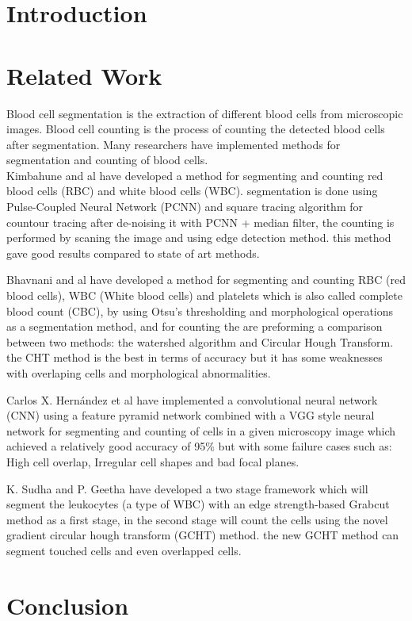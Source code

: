 \section{Introduction}
\vspace{0.2in}
\hspace*{0.16in}

\section{Related Work}
\vspace{0.2in}
\hspace*{0.16in}
Blood cell segmentation is the extraction of different blood cells from microscopic images. Blood cell counting is the process of counting the detected blood cells after segmentation. Many researchers have implemented methods for segmentation and counting of blood cells.\\

Kimbahune and al \textsuperscript{\cite{kimbahune2011blood}} have developed a method for segmenting and counting red blood cells (RBC) and white blood cells (WBC).
segmentation is done using Pulse-Coupled Neural Network (PCNN) and square tracing algorithm for countour tracing after de-noising it with PCNN + median filter, the counting is performed by scaning the image and using edge detection method. this method gave good results compared to state of art methods.

Bhavnani and al \textsuperscript{\cite{bhavnani2016segmentation}} have developed a method for segmenting and counting RBC (red blood cells), WBC (White blood cells) and platelets which is also called complete blood count (CBC), by using Otsu’s thresholding and morphological operations as a segmentation method, and for counting the are preforming a comparison between two methods: the watershed algorithm and Circular Hough Transform. the CHT method is the best in terms of accuracy but it has some weaknesses with overlaping cells and morphological abnormalities.

Carlos X. Hern{\'{a}}ndez et al \textsuperscript{\cite{DBLP:journals/corr/abs-1802-10548}} have implemented a convolutional neural network (CNN) using a feature pyramid network combined with a VGG style neural network for segmenting and counting of cells in a given microscopy image which achieved a relatively good accuracy of 95\% but with some failure cases such as: High cell overlap, Irregular cell shapes and bad focal planes.

K. Sudha and P. Geetha \textsuperscript{\cite{SUDHA2020639}} have developed a two stage framework which will segment the leukocytes (a type of WBC) with an edge strength-based Grabcut method as a first stage, in the second stage will count the cells using the novel gradient circular hough transform (GCHT) method. the new GCHT method can segment touched cells and even overlapped cells.

\section{Conclusion}
\vspace{0.1in}
\hspace*{0.16in}
